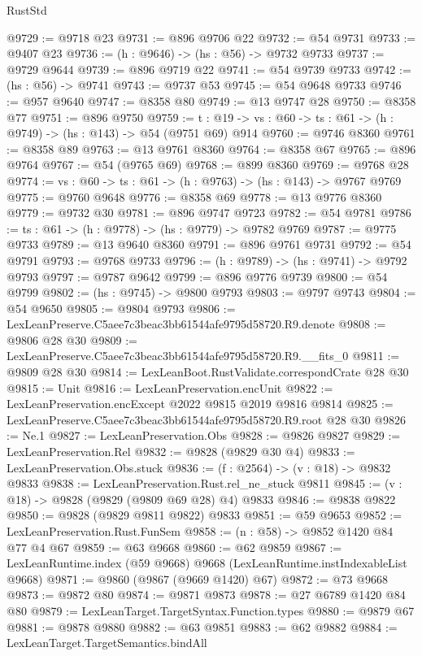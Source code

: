 \begin{lexlean}{RustStd}
\begin{coremodule}
@9729 := @9718 @23
@9731 := @896 @9706 @22
@9732 := @54 @9731
@9733 := @9407 @23
@9736 := (h : @9646) -> (hs : @56) -> @9732 @9733
@9737 := @9729 @9644
@9739 := @896 @9719 @22
@9741 := @54 @9739 @9733
@9742 := (hs : @56) -> @9741
@9743 := @9737 @53
@9745 := @54 @9648 @9733
@9746 := @957 @9640
@9747 := @8358 @80
@9749 := @13 @9747 @28
@9750 := @8358 @77
@9751 := @896 @9750
@9759 := {t : @19} -> {vs : @60} -> {ts : @61} -> (h : @9749) -> (hs : @143) -> @54 (@9751 @69) @914
@9760 := @9746 @8360
@9761 := @8358 @89
@9763 := @13 @9761 @8360
@9764 := @8358 @67
@9765 := @896 @9764
@9767 := @54 (@9765 @69)
@9768 := @899 @8360
@9769 := @9768 @28
@9774 := {vs : @60} -> {ts : @61} -> (h : @9763) -> (hs : @143) -> @9767 @9769
@9775 := @9760 @9648
@9776 := @8358 @69
@9778 := @13 @9776 @8360
@9779 := @9732 @30
@9781 := @896 @9747 @9723
@9782 := @54 @9781
@9786 := {ts : @61} -> (h : @9778) -> (hs : @9779) -> @9782 @9769
@9787 := @9775 @9733
@9789 := @13 @9640 @8360
@9791 := @896 @9761 @9731
@9792 := @54 @9791
@9793 := @9768 @9733
@9796 := (h : @9789) -> (hs : @9741) -> @9792 @9793
@9797 := @9787 @9642
@9799 := @896 @9776 @9739
@9800 := @54 @9799
@9802 := (hs : @9745) -> @9800 @9793
@9803 := @9797 @9743
@9804 := @54 @9650
@9805 := @9804 @9793
@9806 := LexLeanPreserve.C5aee7c3beac3bb61544afe9795d58720.R9.denote
@9808 := @9806 @28 @30
@9809 := LexLeanPreserve.C5aee7c3beac3bb61544afe9795d58720.R9.__fits_0
@9811 := @9809 @28 @30
@9814 := LexLeanBoot.RustValidate.correspondCrate @28 @30
@9815 := Unit
@9816 := LexLeanPreservation.encUnit
@9822 := LexLeanPreservation.encExcept @2022 @9815 @2019 @9816 @9814
@9825 := LexLeanPreserve.C5aee7c3beac3bb61544afe9795d58720.R9.root @28 @30
@9826 := Ne.{1}
@9827 := LexLeanPreservation.Obs
@9828 := @9826 @9827
@9829 := LexLeanPreservation.Rel
@9832 := @9828 (@9829 @30 @4)
@9833 := LexLeanPreservation.Obs.stuck
@9836 := (f : @2564) -> (v : @18) -> @9832 @9833
@9838 := LexLeanPreservation.Rust.rel_ne_stuck @9811
@9845 := (v : @18) -> @9828 (@9829 (@9809 @69 @28) @4) @9833
@9846 := @9838 @9822
@9850 := @9828 (@9829 @9811 @9822) @9833
@9851 := @59 @9653
@9852 := LexLeanPreservation.Rust.FunSem
@9858 := (n : @58) -> @9852 @1420 @84 @77 @4 @67
@9859 := @63 @9668
@9860 := @62 @9859
@9867 := LexLeanRuntime.index (@59 @9668) @9668 (LexLeanRuntime.instIndexableList @9668)
@9871 := @9860 (@9867 (@9669 @1420) @67)
@9872 := @73 @9668
@9873 := @9872 @80
@9874 := @9871 @9873
@9878 := @27 @6789 @1420 @84 @80
@9879 := LexLeanTarget.TargetSyntax.Function.types
@9880 := @9879 @67
@9881 := @9878 @9880
@9882 := @63 @9851
@9883 := @62 @9882
@9884 := LexLeanTarget.TargetSemantics.bindAll

\end{coremodule}
\end{lexlean}
